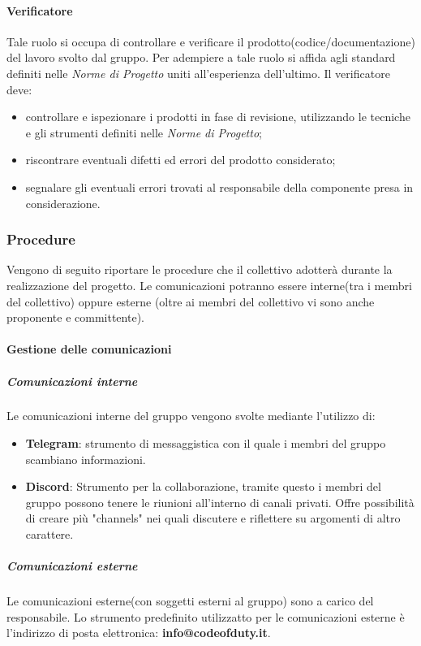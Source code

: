 			\paragraph{Verificatore}
			Tale ruolo si occupa di controllare e verificare il prodotto(codice/documentazione) del lavoro svolto dal gruppo. Per adempiere a tale ruolo si affida agli standard definiti nelle \textit{Norme di Progetto} uniti all'esperienza dell'ultimo. Il verificatore deve:
			\begin{itemize}
				\item controllare e ispezionare i prodotti in fase di revisione, utilizzando le tecniche e gli strumenti definiti nelle \textit{Norme di Progetto};
				\item riscontrare eventuali difetti ed errori del prodotto considerato;
				\item segnalare gli eventuali errori trovati al responsabile della componente presa in considerazione.
			\end{itemize}
		
		
		\subsubsection{Procedure}
		Vengono di seguito riportare le procedure che il collettivo adotterà durante la realizzazione del progetto. Le comunicazioni potranno essere interne(tra i membri del collettivo) oppure esterne (oltre ai membri del collettivo vi sono anche proponente e committente).
		
			\paragraph{Gestione delle comunicazioni}
			
				\subparagraph{Comunicazioni interne}
				Le comunicazioni interne del gruppo vengono svolte mediante l'utilizzo di:
				\begin{itemize}
					\item \textbf{Telegram}: strumento di messaggistica con il quale i membri del gruppo scambiano informazioni.
					\item \textbf{Discord}: Strumento per la collaborazione, tramite questo i membri del gruppo possono tenere le riunioni all'interno di canali privati. Offre possibilità di creare più "channels" nei quali discutere e riflettere su argomenti di altro carattere.
				\end{itemize}  
				
				\subparagraph{Comunicazioni esterne}
				Le comunicazioni esterne(con soggetti esterni al gruppo) sono a carico del responsabile. Lo strumento predefinito utilizzatto per le comunicazioni esterne è l'indirizzo di posta elettronica: \textbf{info@codeofduty.it}.
				
